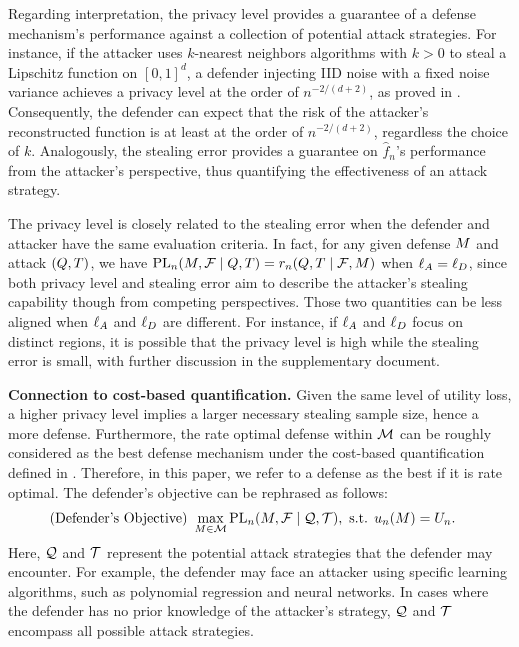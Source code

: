         Regarding interpretation, the privacy level provides a guarantee of a defense mechanism's performance against a collection of potential attack strategies. For instance, if the attacker uses $k$-nearest neighbors algorithms with $k>0$ to steal a Lipschitz function on $[0, 1]^d$, a defender injecting IID noise with a fixed noise variance achieves a privacy level at the order of $n^{-2/(d+2)}$, as proved in . Consequently, the defender can expect that the risk of the attacker's reconstructed function is at least at the order of $n^{-2/(d+2)}$, regardless the choice of $k$. Analogously, the stealing error provides a guarantee on $\hat{f}_n$'s performance from the attacker's perspective, thus quantifying the effectiveness of an attack strategy. 


        The privacy level is closely related to the stealing error when the defender and attacker have the same evaluation criteria. 
        In fact, for any given defense $M$ and attack $(Q,T)$, we have $\textrm{PL}_n(M,\mathcal{F} \mid Q,T) =  r_n(Q, T \mid \mathcal{F},M)$ when $\ell_A=\ell_D$, since both privacy level and stealing error aim to describe the attacker's stealing capability though from competing perspectives. 
        Those two quantities can be less aligned when $\ell_A$ and $\ell_D$ are different. For instance, if $\ell_A$ and $\ell_D$ focus on distinct regions, it is possible that the privacy level is high while the stealing error is small, with further discussion in 
        the supplementary document.
        


        \textbf{Connection to cost-based quantification.} 
        Given the same level of utility loss, a higher privacy level implies a larger necessary stealing sample size, hence a more \eco defense. Furthermore, the rate optimal defense within $\mathcal{M}$ can be roughly considered as the best defense mechanism under the cost-based quantification defined in . Therefore, in this paper, we refer to a defense as the best if it is rate optimal. The defender's objective can be rephrased as follows:
        \begin{align*}
        \text{(Defender's Objective) } &\max_{M \in \mathcal{M}}  \textrm{PL}_n(M,\mathcal{F} \mid \mathcal{Q},\mathcal{T}), \text{ s.t. } u_n(M) = U_n. 
        \end{align*}
        Here, $\mathcal{Q}$ and $\mathcal{T}$ represent the potential attack strategies that the defender may encounter. For example, the defender may face an attacker using specific learning algorithms, such as polynomial regression and neural networks. In cases where the defender has no prior knowledge of the attacker's strategy, $\mathcal{Q}$ and $\mathcal{T}$ encompass all possible attack strategies.
        

